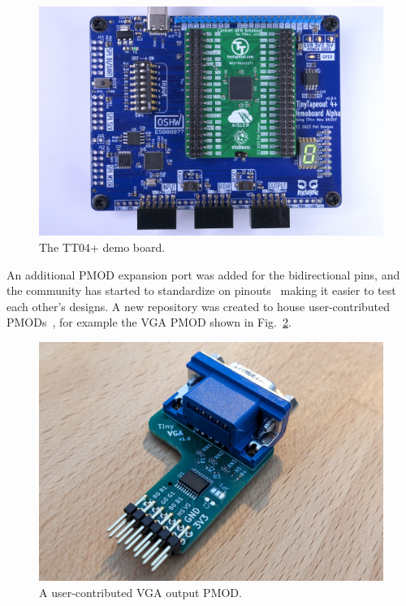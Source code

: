 \begin{figure}[!t]
\centering
\includegraphics[width=\columnwidth]{./Figs/tt04-demoboard-top.jpg}
\caption{The TT04+ demo board\cite{tt04demoboard}.}
\label{fig:TT04plus_demo_board}
\end{figure}

An additional PMOD expansion port was added for the bidirectional pins, and the community has started to standardize on pinouts~\cite{pinouts} making it easier to test each other's designs.
A new repository was created to house user-contributed PMODs~\cite{awesomepmods}, for example the VGA PMOD shown in Fig.~\ref{fig:user_contributed_VGA_PMOD}.

\begin{figure}[!t]
\centering
\includegraphics[width=\columnwidth]{./Figs/tiny_vga_pmod.jpg}
\caption{A user-contributed VGA output PMOD.}
\label{fig:user_contributed_VGA_PMOD}
\end{figure}

